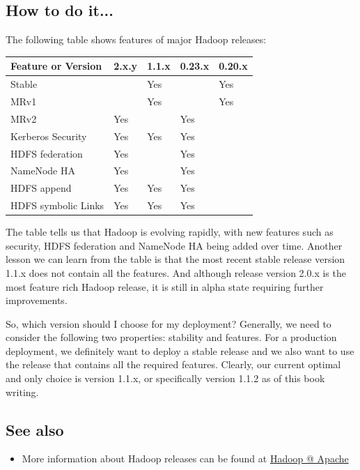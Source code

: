\subsection*{How to do it...}
The following table shows features of major Hadoop releases:
\begin{table}[h]
  \centering
  \begin{tabular}{l|l|l|l|l}
    \toprule
    \textbf{Feature or Version} & \textbf{2.x.y} & \textbf{1.1.x} & \textbf{0.23.x} & \textbf{0.20.x} \\ \midrule
    Stable &  & Yes &  & Yes \\
    MRv1 &  & Yes &  & Yes \\
    MRv2 & Yes &  & Yes & \\
    Kerberos Security & Yes & Yes & Yes & \\
    HDFS federation & Yes &  & Yes & \\
    NameNode HA & Yes &  & Yes &  \\
    HDFS append & Yes & Yes & Yes & \\
    HDFS symbolic Links & Yes & Yes & Yes & \\ \bottomrule
  \end{tabular}
\end{table}
The table tells us that Hadoop is evolving rapidly, with new features such as security, HDFS federation and NameNode HA being added over time. Another lesson we can learn from the table is that the most recent stable release version 1.1.x does not contain all the features. And although release version 2.0.x is the most feature rich Hadoop release, it is still in alpha state requiring further improvements.

So, which version should I choose for my deployment? Generally, we need to consider the following two properties: stability and features. For a production deployment, we definitely want to deploy a stable release and we also want to use the release that contains all the required features. Clearly, our current optimal and only choice is version 1.1.x, or specifically version 1.1.2 as of this book writing.

\subsection*{See also}
\begin{itemize}
  \item More information about Hadoop releases can be found at \href{http://hadoop.apache.org/releases.html}{Hadoop @ Apache}
\end{itemize}

